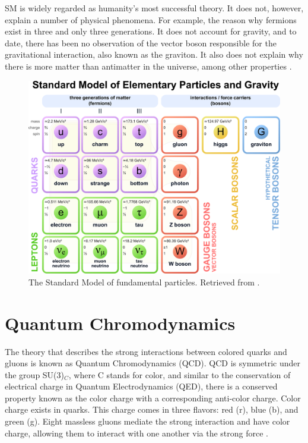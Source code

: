 SM is widely regarded as humanity's most successful theory. It does not, however, explain a number of physical phenomena. For example, the reason why fermions exist in three and only three generations. It does not account for gravity, and to date, there has been no observation of the vector boson responsible for the gravitational interaction, also known as the graviton. It also does not explain why there is more matter than antimatter in the universe, among other properties \cite{grummer2021search, danilov2020measurement}.
\begin{figure}[htp!]
	\centering
	\includegraphics[scale=0.34]{MainContent/Figs/SM.eps}
	\caption{The Standard Model of fundamental particles. Retrieved from \cite{danilov2020measurement}.}
	\label{fig:sm}
\end{figure}

\section{Quantum Chromodynamics}
The theory that describes the strong interactions between colored quarks and gluons is known as Quantum Chromodynamics (QCD). QCD is symmetric under the group SU(3)$_C$, where C stands for color, and similar to the conservation of electrical charge in Quantum Electrodynamics (QED), there is a conserved property known as the color charge with a corresponding anti-color charge. Color charge exists in quarks. This charge comes in three flavors: red (r), blue (b), and green (g). Eight massless gluons mediate the strong interaction and have color charge, allowing them to interact with one another via the strong force \cite{stiller2016full, di2020measurement, thomson2013modern}.

